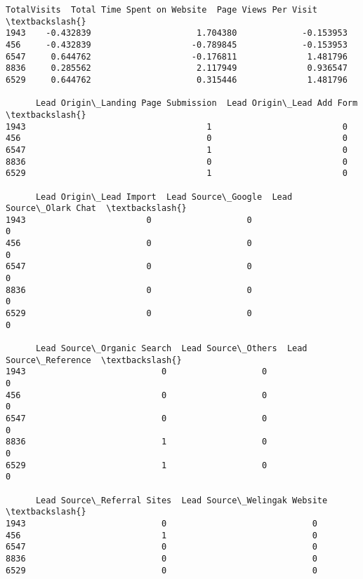 \documentclass[11pt]{article}
\makeatletter
\newcommand{\boxspacing}{\kern\kvtcb@left@rule\kern\kvtcb@boxsep}
\newcommand{\prompt}[4]{
        \ttfamily\llap{{\color{#2}[#3]:\hspace{3pt}#4}}\vspace{-\baselineskip}
    }
\makeatother
\begin{document}
            \begin{tcolorbox}[breakable, size=fbox, boxrule=.5pt, pad at break*=1mm, opacityfill=0]
\prompt{Out}{outcolor}{108}{\boxspacing}
\begin{Verbatim}[commandchars=\\\{\}]
      TotalVisits  Total Time Spent on Website  Page Views Per Visit  \textbackslash{}
1943    -0.432839                     1.704380             -0.153953
456     -0.432839                    -0.789845             -0.153953
6547     0.644762                    -0.176811              1.481796
8836     0.285562                     2.117949              0.936547
6529     0.644762                     0.315446              1.481796

      Lead Origin\_Landing Page Submission  Lead Origin\_Lead Add Form  \textbackslash{}
1943                                    1                          0
456                                     0                          0
6547                                    1                          0
8836                                    0                          0
6529                                    1                          0

      Lead Origin\_Lead Import  Lead Source\_Google  Lead Source\_Olark Chat  \textbackslash{}
1943                        0                   0                       0
456                         0                   0                       0
6547                        0                   0                       0
8836                        0                   0                       0
6529                        0                   0                       0

      Lead Source\_Organic Search  Lead Source\_Others  Lead Source\_Reference  \textbackslash{}
1943                           0                   0                      0
456                            0                   0                      0
6547                           0                   0                      0
8836                           1                   0                      0
6529                           1                   0                      0

      Lead Source\_Referral Sites  Lead Source\_Welingak Website  \textbackslash{}
1943                           0                             0
456                            1                             0
6547                           0                             0
8836                           0                             0
6529                           0                             0


\end{Verbatim}
\end{tcolorbox}
\end{document}
